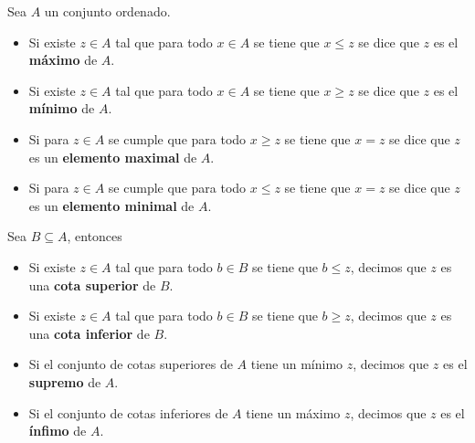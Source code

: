 \begin{definition}

Sea $A$ un conjunto ordenado.  

\begin{itemize}

\item Si existe $z \in A$ tal que para todo $x \in A$ se tiene que $x \leq z$ se dice que $z$ es el \textbf{máximo}  de $A$.

\item Si existe $z \in A$ tal que para todo $x \in A$ se tiene que $x \geq z$ se dice que $z$ es el \textbf{mínimo}  de $A$.

\item Si para $z \in A$ se cumple que para todo $x \geq z$ se tiene que $x = z$ se dice que $z$ es un \textbf{elemento maximal}  de $A$.

\item Si para $z \in A$ se cumple que para todo $x \leq z$ se tiene que $x = z$ se dice que $z$ es un \textbf{elemento minimal}  de $A$.

\end{itemize}

Sea $B \subseteq A$, entonces

\begin{itemize}

\item Si existe $z \in A$ tal que para todo $b \in B$ se tiene que $b \leq z$, decimos que $z$ es una \textbf{cota superior}  de $B$.

\item Si existe $z \in A$ tal que para todo $b \in B$ se tiene que $b \geq z$, decimos que $z$ es una \textbf{cota inferior}  de $B$.

\item Si el conjunto de cotas superiores de $A$ tiene un mínimo $z$, decimos que $z$ es el \textbf{supremo}  de $A$.

\item Si el conjunto de cotas inferiores de $A$ tiene un máximo $z$, decimos que $z$ es el \textbf{ínfimo}  de $A$.

\end{itemize}

\end{definition}

